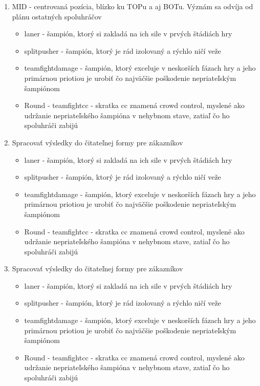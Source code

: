 \begin{enumerate}
\begin{itemize}
	\end{itemize}
	\item MID - centrovaná pozícia, blízko ku TOPu a aj BOTu. Význám sa odvíja od plánu ostatných spoluhráčov
	\begin{itemize}
		\item laner - šampión, ktorý si zakladá na ich sile v prvých štádiách hry
		\item splitpusher - šampión, ktorý je rád izolovaný a rýchlo ničí veže
		\item teamfightdamage - šampión, ktorý exceluje v neskorších fázach hry a jeho primárnou priotiou je urobiť čo najväčšie poškodenie nepriateľským šampiónom
		\item Round - teamfightcc - skratka cc znamená crowd control, myslené ako udržanie nepriateľského šampióna v nehybnom stave, zatiaľ čo ho spoluhráči zabijú
	\end{itemize}
	\item Spracovať výsledky do čitateľnej formy pre zákazníkov
	\begin{itemize}
		\item laner - šampión, ktorý si zakladá na ich sile v prvých štádiách hry
		\item splitpusher - šampión, ktorý je rád izolovaný a rýchlo ničí veže
		\item teamfightdamage - šampión, ktorý exceluje v neskorších fázach hry a jeho primárnou priotiou je urobiť čo najväčšie poškodenie nepriateľským šampiónom
		\item Round - teamfightcc - skratka cc znamená crowd control, myslené ako udržanie nepriateľského šampióna v nehybnom stave, zatiaľ čo ho spoluhráči zabijú
	\end{itemize}
\item Spracovať výsledky do čitateľnej formy pre zákazníkov
\begin{itemize}
	\item laner - šampión, ktorý si zakladá na ich sile v prvých štádiách hry
	\item splitpusher - šampión, ktorý je rád izolovaný a rýchlo ničí veže
	\item teamfightdamage - šampión, ktorý exceluje v neskorších fázach hry a jeho primárnou priotiou je urobiť čo najväčšie poškodenie nepriateľským šampiónom
	\item Round - teamfightcc - skratka cc znamená crowd control, myslené ako udržanie nepriateľského šampióna v nehybnom stave, zatiaľ čo ho spoluhráči zabijú
\end{itemize}
\end{enumerate}
